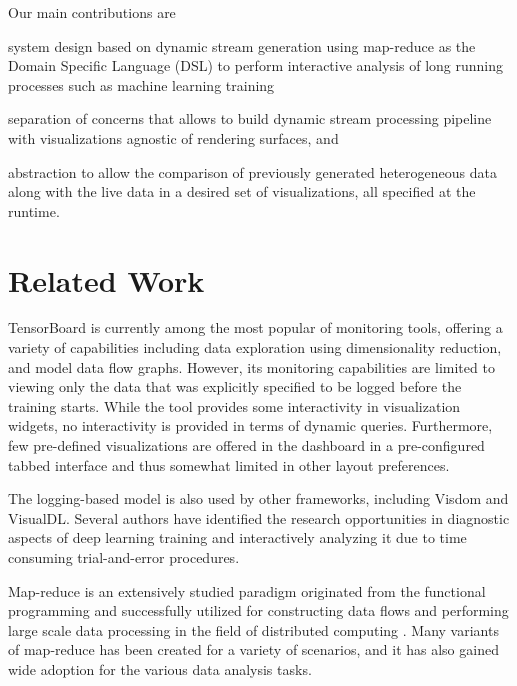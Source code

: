 \documentclass[sigchi]{acmart}
\begin{document}
Our main contributions are
\begin{enumerate*}
\item system design based on dynamic stream generation using map-reduce as the Domain Specific Language (DSL) to perform interactive analysis of long running processes such as machine learning training
\item separation of concerns that allows to build dynamic stream processing pipeline with visualizations agnostic of rendering surfaces, and 
\item abstraction to allow the comparison of previously generated heterogeneous data along with the live data in a desired set of visualizations, all specified at the runtime.
\end{enumerate*}

\section{Related Work}
TensorBoard\cite{Wongsuphasawat2018} is currently among the most popular of monitoring tools, offering a variety of capabilities including data exploration using dimensionality reduction, and model data flow graphs. However, its monitoring capabilities are limited to viewing only the data that was explicitly specified to be logged before the training starts. While the tool provides some interactivity in visualization widgets, no  interactivity is provided in terms of dynamic queries. Furthermore, few pre-defined visualizations are offered in the dashboard in a pre-configured tabbed interface and thus somewhat limited in other layout preferences. 

The logging-based model is also used by other frameworks, including Visdom\cite{Choo2018} and VisualDL\cite{VisualDL}. Several authors\cite{Liu2017,DBLP:journals/corr/abs-1712-05902,Choo2018} have identified the research opportunities in diagnostic aspects of deep learning training and interactively analyzing it due to time consuming trial-and-error procedures.

Map-reduce is an extensively studied paradigm originated from the functional programming \cite{Steele1995} and successfully utilized for constructing data flows and performing large scale data processing in the field of distributed computing \cite{Dean2008,Gates:2009:BHD:1687553.1687568,Catanzaro2008AMR}. Many variants of map-reduce has been created\cite{Afrati:2011:MER:1951365.1951367} for a variety of scenarios, and it has also gained wide adoption for the various data analysis tasks\cite{Ekanayake2008,Pavlo:2009:CAL:1559845.1559865}.
\end{document}
